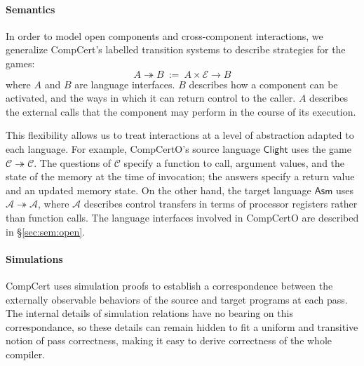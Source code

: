 \documentclass[acmsmall,authordraft]{acmart}
\newcommand{\kw}[1]{\ensuremath{ \mathsf{#1} }}
\begin{document}
\paragraph{Semantics} %

In order to model open components and cross-component interactions,
we generalize CompCert's labelled transition systems
to describe strategies for the games:
\[ A \twoheadrightarrow B \: := \:
   A \times \mathcal{E} \rightarrow B \]
where $A$ and $B$ are language interfaces.
$B$ describes how a component can be activated,
and the ways in which it can return control to the caller.
$A$ describes the external calls that the component
may perform in the course of its execution.

This flexibility allows us to treat interactions
at a level of abstraction adapted to each language.
For example, CompCertO's source language \kw{Clight} uses the game
\mbox{$\mathcal{C} \twoheadrightarrow \mathcal{C}$}.
The questions of $\mathcal{C}$ specify a function to call,
argument values,
and the state of the memory at the time of invocation;
the answers specify a return value and an updated memory state.
On the other hand, the target language \kw{Asm} uses
$\mathcal{A} \twoheadrightarrow \mathcal{A}$,
where $\mathcal{A}$ describes control transfers
in terms of processor registers
rather than function calls.
The language interfaces involved in CompCertO
are described in \S\ref{sec:sem:open}.



\paragraph{Simulations} %

CompCert uses simulation proofs
to establish a correspondence between
the externally observable behaviors of
the source and target programs at each pass.
The internal details of simulation relations
have no bearing on this correspondance,
so these details can remain hidden
to fit a uniform and transitive notion of pass correctness,
making it easy to derive correctness
of the whole compiler.
\end{document}
